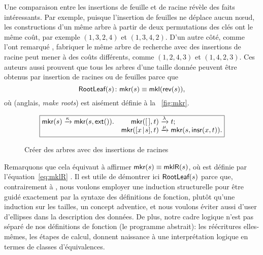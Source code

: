 Une comparaison entre les insertions de feuille et de racine révèle
des faits intéressants. Par exemple, puisque l'insertion de feuilles
ne déplace aucun n{\oe}ud, les constructions d'un même arbre à partir
de deux permutations des clés ont le même coût, par exemple
\((1,3,2,4)\) et \((1,3,4,2)\). D'un autre côté, comme l'ont remarqué
\cite{GeldenhuysVanderMerwe_2009}, fabriquer le même arbre de
recherche avec des insertions de racine peut mener à des coûts
différents, comme \((1,2,4,3)\) et \((1,4,2,3)\). Ces auteurs aussi
prouvent que tous les arbres d'une taille donnée peuvent être obtenus
par insertion de racines ou de feuilles parce que
\begin{equation}
\pred{RootLeaf}{s} \colon \fun{mkr}(s) \equiv \fun{mkl}(\fun{rev}(s)),
\label{thm_RootLeaf}
\index{RootLeaf@\predName{RootLeaf}}
\end{equation}
où  
(anglais, \emph{make roots}) est aisément définie à la
\fig~\vref{fig:mkr}.
\begin{figure}
\begin{equation*}
\boxed{
\begin{array}{@{}r@{\;}l@{\;}lr@{\;}l@{\;}l@{}}
\fun{mkr}(s) & \xrightarrow{\smash{\kappa}} &
\fun{mkr}(s,\fun{ext}()).
& \fun{mkr}(\el,t) & \xrightarrow{\smash{\lambda}} & t;\\
&&&\fun{mkr}(\cons{x}{s},t) & \xrightarrow{\smash{\mu}} & \fun{mkr}(s,\fun{insr}(x,t)).
\end{array}}
\end{equation*}
\caption{Créer des arbres avec des insertions de racines}
\label{fig:mkr}
\end{figure}
Remarquons que cela équivaut à affirmer \(\textsf{mkr}(s) \equiv
\textsf{mklR}(s)\), où  est définie par
l'équation~\eqref{eq:mklR} . Il est utile de
démontrer ici \(\textsf{RootLeaf}({s})\) parce que, contrairement à
\cite{GeldenhuysVanderMerwe_2009}, nous voulons employer une induction
structurelle pour être guidé exactement par la syntaxe des définitions
de fonction, plutôt qu'une induction sur les tailles, un concept
adventice, et nous voulons éviter aussi d'user d'ellipses dans la
description des données. De plus, notre cadre logique n'est pas séparé
de nos définitions de fonction (le programme abstrait): les
réécritures elles-mêmes, les étapes de calcul, donnent naissance à
une interprétation logique en termes de classes d'équivalences.

